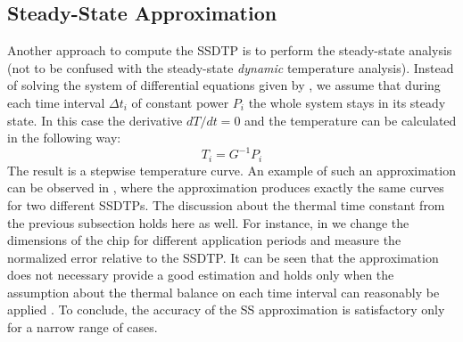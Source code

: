 \subsection{Steady-State Approximation}
Another approach to compute the SSDTP is to perform the steady-state analysis \cite{huang2009} (not to be confused with the steady-state \emph{dynamic} temperature analysis). Instead of solving the system of differential equations given by , we assume that during each time interval $\Delta t_i$ of constant power $P_i$ the whole system stays in its steady state. In this case the derivative \mbox{$dT/dt = 0$} and the temperature can be calculated in the following way:
\[
  T_i = G^{-1} P_i
\]
The result is a stepwise temperature curve. An example of such an approximation can be observed in , where the approximation produces exactly the same curves for two different SSDTPs. The discussion about the thermal time constant from the previous subsection holds here as well. For instance, in  we change the dimensions of the chip for different application periods and measure the normalized error relative to the SSDTP. It can be seen that the approximation does not necessary provide a good estimation and holds only when the assumption about the thermal balance on each time interval can reasonably be applied \cite{huang2009}. To conclude, the accuracy of the SS approximation is satisfactory only for a narrow range of cases.

